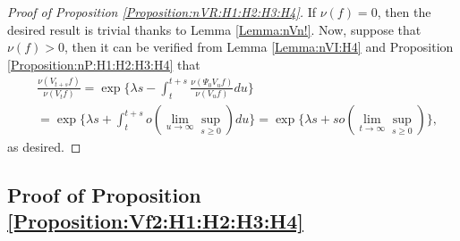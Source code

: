 \documentclass[12pt,a4paper]{amsart}
\numberwithin{equation}{section}
\theoremstyle{plain}
\theoremstyle{definition}
\theoremstyle{remark}
\begin{document}
\begin{proof}[{Proof of Proposition \ref{Proposition:nVR:H1:H2:H3:H4}}]
If $\nu(f) = 0$, then the desired result is trivial thanks to Lemma \ref{Lemma:nVn!}. 
Now, suppose that $\nu(f)>0$, then it can be verified from Lemma \ref{Lemma:nVI:H4} and Proposition \ref{Proposition:nP:H1:H2:H3:H4} that
\begin{align}
  &\frac{\nu(V_{t+s} f)} {\nu(V_t f)} 
  = \exp \Big\{ \lambda s - \int_t^{t+s} \frac{\nu(\Psi_0 V_u f)}{ \nu(V_u f)} du\Big\}
  \\&= \exp\Big\{\lambda s + \int_t^{t+s} o(\lim_{u\to \infty}\sup_{s\geq 0}) du\Big\}
  = \exp\Big\{\lambda s + so(\lim_{t\to \infty} \sup_{s\geq 0})\Big\},
  \end{align}
as desired.
\end{proof}
\subsection{Proof of Proposition \ref{Proposition:Vf2:H1:H2:H3:H4}}
\end{document}

